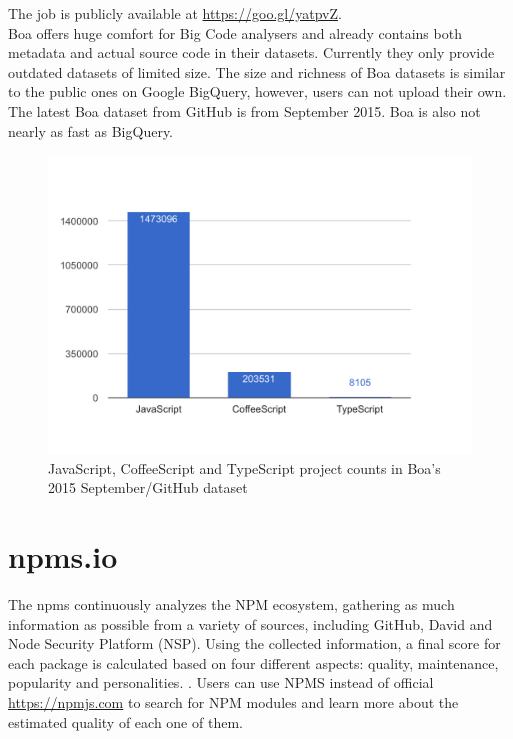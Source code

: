 \documentclass[thesis=M,english]{FITthesis}[2012/10/20]
\begin{document}
The job is publicly available at \url{https://goo.gl/yatpvZ}. \\

Boa offers huge comfort for Big Code analysers and already contains both metadata and actual source code in their datasets. Currently they only provide outdated datasets of limited size. The size and richness of Boa datasets is similar to the public ones on Google BigQuery, however, users can not upload their own. The latest Boa dataset from GitHub is from September 2015. Boa is also not nearly as fast as BigQuery. \\

\begin{center}
\begin{figure}[h!]
	\includegraphics[totalheight=265pt]{images/boa_counts.png}
	\caption{JavaScript, CoffeeScript and TypeScript  project counts in Boa's 2015 September/GitHub dataset}
	\label{fig: boa_counts}
\end{figure}
\end{center}


\section{npms.io}

The npms continuously analyzes the NPM ecosystem, gathering as much information as possible from a variety of sources, including GitHub, David and Node Security Platform (NSP). Using the collected information, a final score for each package is calculated based on four different aspects: quality, maintenance, popularity and personalities. \cite{npms}. Users can use NPMS instead of official \url{https://npmjs.com} to search for NPM modules and learn more about the estimated quality of each one of them.
\end{document}
